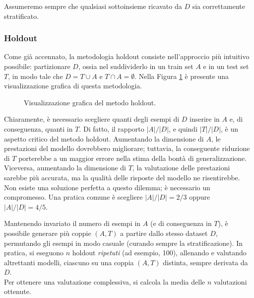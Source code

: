 Assumeremo sempre che qualsiasi sottoinsieme ricavato da $D$ sia correttamente stratificato.

\subsubsection{Holdout}
Come già accennato, la metodologia holdout consiste nell'approccio più intuitivo possibile: partizionare $D$, ossia nel suddividerlo in un train set $A$ e in un test set $T$, in modo tale che $D = T \cup A $ e $ T \cap A = \emptyset$. Nella Figura \ref{fig:holdout} è presente una visualizzazione grafica di questa metodologia.

\begin{figure}[h]
    \centering
    \begin{center}
\end{center}
    \caption{Visualizzazione grafica del metodo holdout.}
    \label{fig:holdout}
\end{figure}

Chiaramente, è necessario scegliere quanti degli esempi di $D$ inserire in $A$ e, di conseguenza, quanti in $T$. Di fatto, il rapporto $|A|/|D|$, e quindi $|T|/|D|$, è un aspetto critico del metodo holdout.
Aumentando la dimensione di $A$, le prestazioni del modello dovrebbero migliorare; tuttavia, la conseguente riduzione di $T$ porterebbe a un maggior errore nella stima della bontà di generalizzazione. Viceversa, aumentando la dimensione di $T$, la valutazione delle prestazioni sarebbe più accurata, ma la qualità delle risposte del modello ne risentirebbe.
Non esiste una soluzione perfetta a questo dilemma; è necessario un compromesso. Una pratica comune è
scegliere $|A|/|D| = 2/3$ oppure $|A|/|D| = 4/5$.

Mantenendo invariato il numero di esempi in $A$ (e di conseguenza in $T$), è possibile generare più coppie $(A,T)$ a partire dallo stesso dataset $D$, permutando gli esempi in modo casuale (curando sempre la stratificazione). In pratica, si eseguono $n$ holdout \textit{ripetuti} (ad esempio, 100), allenando e valutando altrettanti modelli, ciascuno su una coppia $(A,T)$ distinta, sempre derivata da $D$. \\
Per ottenere una valutazione complessiva, si calcola la media delle $n$ valutazioni ottenute. 

